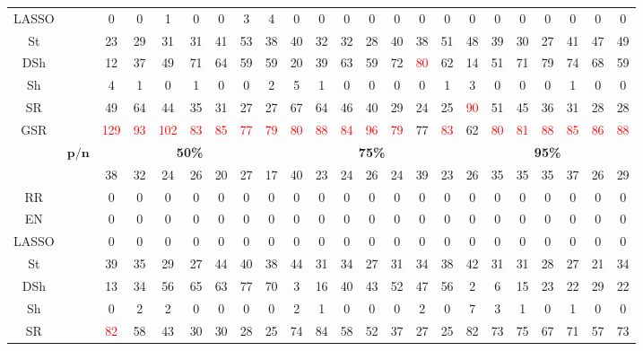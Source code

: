 \begin{table}
{\begin{tabular*}{\textwidth}{@{\extracolsep{\fill}}cc|ccccccc|ccccccc|ccccccc@{}}
LASSO &  & 0 & 0 & 1 & 0 & 0 & 3 & 4 & 0 & 0 & 0 & 0 & 0 & 0 & 0 & 0 & 0 & 0 & 0 & 0 & 0 & 0 \\
St &  & 23 & 29 & 31 & 31 & 41 & 53 & 38 & 40 & 32 & 32 & 28 & 40 & 38 & 51 & 48 & 39 & 30 & 27 & 41 & 47 & 49 \\
DSh &  & 12 & 37 & 49 & 71 & 64 & 59 & 59 & 20 & 39 & 63 & 59 & 72 & \textcolor{red}{80} & 62 & 14 & 51 & 71 & 79 & 74 & 68 & 59 \\
Sh &  & 4 & 1 & 0 & 1 & 0 & 0 & 2 & 5 & 1 & 0 & 0 & 0 & 0 & 1 & 3 & 0 & 0 & 0 & 1 & 0 & 0 \\
SR &  & 49 & 64 & 44 & 35 & 31 & 27 & 27 & 67 & 64 & 46 & 40 & 29 & 24 & 25 & \textcolor{red}{90} & 51 & 45 & 36 & 31 & 28 & 28 \\
GSR &  & \textcolor{red}{129} & \textcolor{red}{93} & \textcolor{red}{102} & \textcolor{red}{83} & \textcolor{red}{85} & \textcolor{red}{77} & \textcolor{red}{79} & \textcolor{red}{80} & \textcolor{red}{88} & \textcolor{red}{84} & \textcolor{red}{96} & \textcolor{red}{79} & 77 & \textcolor{red}{83} & 62 & \textcolor{red}{80} & \textcolor{red}{81} & \textcolor{red}{88} & \textcolor{red}{85} & \textcolor{red}{86} & \textcolor{red}{88} \\
\hline
\multirow{2}{*}{} & $\bm{p/n}$ & \multicolumn{7}{c|}{\textbf{50\%}} & \multicolumn{7}{c|}{\textbf{75\%}} & \multicolumn{7}{c}{\textbf{95\%}} \\
\hline
OLS &  & 38 & 32 & 24 & 26 & 20 & 27 & 17 & 40 & 23 & 24 & 26 & 24 & 39 & 23 & 26 & 35 & 35 & 35 & 37 & 26 & 29 \\
RR &  & 0 & 0 & 0 & 0 & 0 & 0 & 0 & 0 & 0 & 0 & 0 & 0 & 0 & 0 & 0 & 0 & 0 & 0 & 0 & 0 & 0 \\
EN &  & 0 & 0 & 0 & 0 & 0 & 0 & 0 & 0 & 0 & 0 & 0 & 0 & 0 & 0 & 0 & 0 & 0 & 0 & 0 & 0 & 0 \\
LASSO &  & 0 & 0 & 0 & 0 & 0 & 0 & 0 & 0 & 0 & 0 & 0 & 0 & 0 & 0 & 0 & 0 & 0 & 0 & 0 & 0 & 0 \\
St &  & 39 & 35 & 29 & 27 & 44 & 40 & 38 & 44 & 31 & 34 & 27 & 31 & 34 & 38 & 42 & 31 & 31 & 28 & 27 & 21 & 34 \\
DSh &  & 13 & 34 & 56 & 65 & 63 & 77 & 70 & 3 & 16 & 40 & 43 & 52 & 47 & 56 & 2 & 6 & 15 & 23 & 22 & 29 & 22 \\
Sh &  & 0 & 2 & 2 & 0 & 0 & 0 & 0 & 2 & 1 & 0 & 0 & 0 & 2 & 0 & 7 & 3 & 1 & 0 & 1 & 0 & 0 \\
SR &  & \textcolor{red}{82} & 58 & 43 & 30 & 30 & 28 & 25 & 74 & 84 & 58 & 52 & 37 & 27 & 25 & 82 & 73 & 75 & 67 & 71 & 57 & 73 \\

\end{tabular*}}
\end{table}
